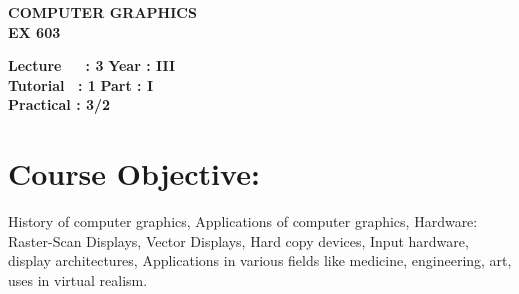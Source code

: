 \begin{center}
    \textbf{\huge{\uppercase{Computer Graphics}}}
    \\
    \vspace{.5cm}
    \textbf{\large{EX 603}}
\end{center}

\noindent\textbf{Lecture\ \ \ : 3} \hfill \textbf{Year : III} \\
\textbf{Tutorial \ : 1} \hfill \textbf{Part : I } \\
\textbf{Practical : 3/2}  \\

\par
\noindent 
\section*{Course Objective:}
History of computer graphics, Applications of computer graphics, Hardware: Raster-Scan Displays, Vector Displays, Hard copy devices, Input hardware, display architectures, Applications in various fields like medicine, engineering, art, uses in virtual realism.

